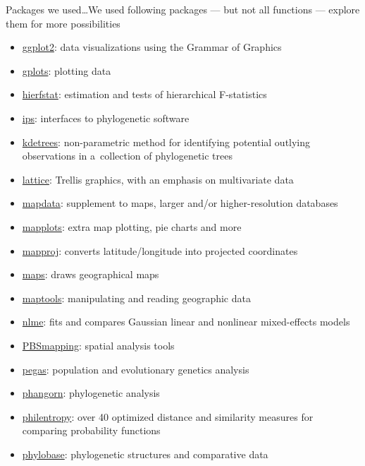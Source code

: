 \documentclass[compress, ucs, xelatex, 11pt, xcolor=svgnames, aspectratio=169,
	hyperref={
		bookmarks=true,
		unicode=true,
		colorlinks=true,
		pdftitle={Molecular data in R},
		plainpages=false,
		pdfauthor={Vojtech Zeisek},
		pdfsubject={Course about phylogeny and evolution in R},
		pdfcreator={XeLaTeX},
		pdfkeywords={R, evolution, phylogeny, molecular data},
		linkcolor=Crimson, %
		anchorcolor=Magenta, %
		citecolor=Magenta, %
		filecolor=Magenta, %
		menucolor=Magenta, %
		urlcolor=DodgerBlue, %
		pdftex},
	url={hyphens, lowtilde} %
	]{beamer}
\begin{document}
\begin{frame}[allowframebreaks]{Packages we used\ldots}{We used following packages --- but not all functions --- explore them for more possibilities}
\begin{itemize}
		\item \href{https://CRAN.R-project.org/package=ggplot2}{ggplot2}: data visualizations using the Grammar of Graphics
		\item \href{https://CRAN.R-project.org/package=gplots}{gplots}: plotting data
		\item \href{https://CRAN.R-project.org/package=hierfstat}{hierfstat}: estimation and tests of hierarchical F-statistics
		\item \href{https://CRAN.R-project.org/package=ips}{ips}: interfaces to phylogenetic software
		\item \href{https://CRAN.R-project.org/package=kdetrees}{kdetrees}: non-parametric method for identifying potential outlying observations in a~collection of phylogenetic trees
		\item \href{https://CRAN.R-project.org/package=lattice}{lattice}: Trellis graphics, with an emphasis on multivariate data
		\item \href{https://CRAN.R-project.org/package=mapdata}{mapdata}: supplement to maps, larger and/or higher-resolution databases
		\item \href{https://CRAN.R-project.org/package=mapplots}{mapplots}: extra map plotting, pie charts and more
		\item \href{https://CRAN.R-project.org/package=mapproj}{mapproj}: converts latitude/longitude into projected coordinates
		\item \href{https://CRAN.R-project.org/package=maps}{maps}: draws geographical maps
		\item \href{https://CRAN.R-project.org/package=maptools}{maptools}: manipulating and reading geographic data
		\item \href{https://CRAN.R-project.org/package=nlme}{nlme}: fits and compares Gaussian linear and nonlinear mixed-effects models
		\item \href{https://CRAN.R-project.org/package=PBSmapping}{PBSmapping}: spatial analysis tools
		\item \href{https://CRAN.R-project.org/package=pegas}{pegas}: population and evolutionary genetics analysis
		\item \href{https://CRAN.R-project.org/package=phangorn}{phangorn}: phylogenetic analysis
		\item \href{https://CRAN.R-project.org/package=philentropy}{philentropy}: over 40 optimized distance and similarity measures for comparing probability functions
		\item \href{https://CRAN.R-project.org/package=phylobase}{phylobase}: phylogenetic structures and comparative data

\end{itemize}
\end{frame}
\end{document}

